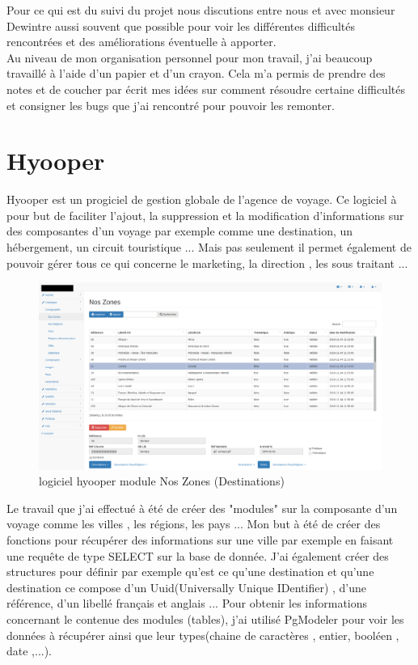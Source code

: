 \documentclass[12pt,a4paper]{report}
\begin{document}
Pour ce qui est du suivi du projet nous discutions entre nous et avec monsieur Dewintre aussi souvent que possible pour voir les différentes difficultés rencontrées et des améliorations éventuelle à apporter.\\

Au niveau de mon organisation personnel pour mon travail, j'ai beaucoup travaillé à l'aide d'un papier et d'un crayon. Cela m'a permis de prendre des notes et de coucher par écrit mes idées sur comment résoudre certaine difficultés et consigner les bugs que j'ai rencontré pour pouvoir les remonter.\\

\section{Hyooper}

Hyooper est un progiciel de gestion globale de l'agence de voyage. Ce logiciel à pour but de faciliter l'ajout, la suppression et la modification d'informations sur des composantes d'un voyage par exemple comme  une destination, un hébergement, un circuit touristique ... Mais pas seulement il permet également de pouvoir gérer tous ce qui concerne le marketing, la direction , les sous traitant ...\\

\begin{figure}[!h]
\centerline{\includegraphics[scale=0.3]{hyooper.png}}
\caption{logiciel hyooper module Nos Zones (Destinations)}
\label{image_hyooper}
\end{figure}



Le travail que j'ai effectué à été de créer des "modules" sur la composante d'un voyage comme les villes , les régions, les pays ... Mon but à été de créer des fonctions pour récupérer des informations sur une ville par exemple en faisant une requête de type SELECT sur la base de donnée. J'ai également créer des structures pour définir par exemple qu'est ce qu'une destination et qu'une destination ce compose d'un Uuid(Universally Unique IDentifier) , d'une référence, d'un libellé  français et anglais ... Pour obtenir les informations concernant le contenue des modules (tables), j'ai utilisé PgModeler pour voir les données à récupérer ainsi que leur types(chaine de caractères , entier, booléen , date ,...).\\
\end{document}
